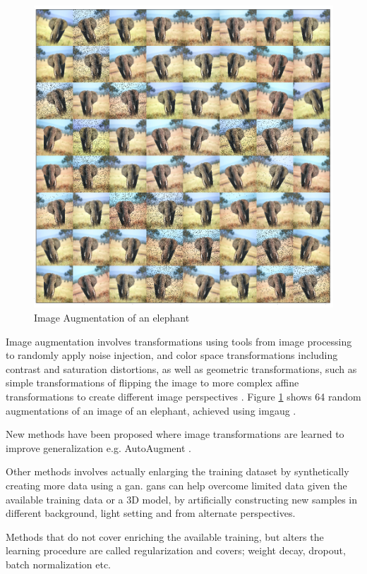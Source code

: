 \begin{description}
	\begin{figure}[H]
		\centering
		\includegraphics[width=.7\linewidth]{figures/augmentation/augmentation_high_resolution.png}
		\caption[Image Augmentaion Example]{Image Augmentation of an elephant}
		\label{fig:augmentation}
	\end{figure}
	
	Image augmentation involves transformations using tools from image processing to randomly apply noise injection, and color space transformations including contrast and saturation distortions, as well as geometric transformations, such as simple transformations of flipping the image to more complex affine transformations to create different image perspectives \cite{shorten_survey_2019}. Figure \ref{fig:augmentation} shows 64 random augmentations of an image of an elephant, achieved using \gls{imgaug} \cite{jung_imgaug:_nodate}. 
	
	New methods have been proposed where image transformations are learned to improve generalization e.g. AutoAugment \cite{cubuk_autoaugment:_2018}. 
	
	Other methods involves actually enlarging the training dataset by synthetically creating more data using a \gls{gan}. \gls{gan}s can help overcome limited data given the available training data or a 3D model, by artificially constructing new samples in different background, light setting and from alternate perspectives.
	
	Methods that do not cover enriching the available training, but alters the learning procedure are called regularization and covers; weight decay, dropout, batch normalization etc.
	

\end{description}

